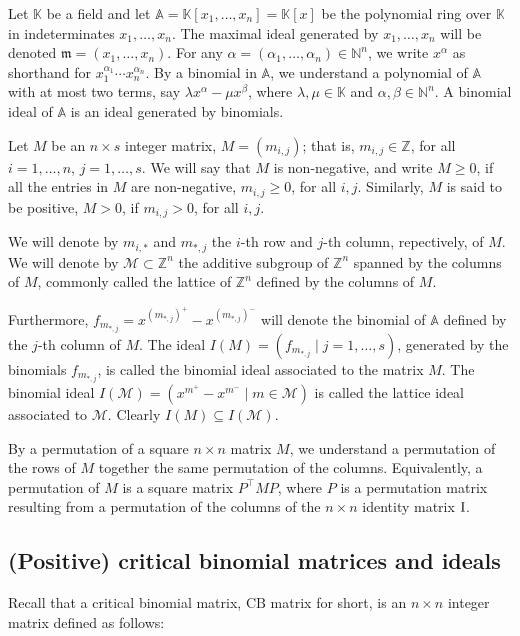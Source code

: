 \documentclass[ALCO]{cedram}
\newcommand{\mbn}{\mbox{$\mathbb{N}$}}
\newcommand{\mbz}{\mbox{$\mathbb{Z}$}}
\newcommand{\mbk}{\mbox{$\mathbb{K}$}}
\newcommand{\mba}{\mbox{$\mathbb{A}$}}
\newcommand{\mcm}{\mbox{$\mathcal{M}$}}
\newcommand{\cb}{\mbox{$\mathrm{CB}$}}
\newcommand{\mfm}{\mbox{$\mathfrak{m}$}}
\newcommand{\I}{\mbox{${\rm I}$}}
\begin{document}
Let $\mbk$ be a field and let $\mba=\mbk[x_1,\ldots ,x_n]=\mbk[x]$ be the
polynomial ring over $\mbk$ in indeterminates $x_1,\ldots ,x_n$. The
maximal ideal generated by $x_1,\ldots ,x_n$ will be denoted
$\mfm=(x_1,\ldots ,x_n)$.  For any $\alpha=(\alpha_1,\ldots
,\alpha_n)\in\mbn^n$, we write $x^\alpha$ as shorthand for
$x_1^{\alpha_1}\cdots x_n^{\alpha_n}$. By a binomial in $\mba$, we
understand a polynomial of $\mba$ with at most two terms, say $\lambda
x^\alpha-\mu x^\beta$, where $\lambda, \mu\in\mbk$ and
$\alpha,\beta\in\mbn^{n}$. A binomial ideal of $\mba$ is an ideal
generated by binomials.

Let $M$ be an $n\times s$ integer matrix, $M=(m_{i,j})$; that is,
$m_{i,j}\in\mbz$, for all $i=1,\ldots ,n$, $j=1,\ldots ,s$. We will
say that $M$ is non-negative, and write $M\geq 0$, if all the entries
in $M$ are non-negative, \ie $m_{i,j}\geq 0$, for all
$i,j$. Similarly, $M$ is said to be positive, $M>0$, if $m_{i,j}>0$,
for all $i,j$.

We will denote by $m_{i,*}$ and $m_{*,j}$ the $i$-th row and $j$-th
column, repectively, of $M$. We will denote by $\mcm\subset \mbz^n$
the additive subgroup of $\mbz^n$ spanned by the columns of $M$,
commonly called the lattice of $\mbz^{n}$ defined by the columns of
$M$.

Furthermore, $f_{m_{*,j}}=x^{(m_{*,j})^+}-x^{(m_{*,j})^-}$ will denote
the binomial of $\mba$ defined by the $j$-th column of $M$. The ideal
$I(M)=(f_{m_{*,j}}\mid j=1,\ldots ,s)$, generated by the binomials
$f_{m_{*,j}}$, is called the binomial ideal associated to the matrix
$M$. The binomial ideal $I(\mcm)=(x^{m^+}-x^{m^-}\mid m\in\mcm)$ is
called the lattice ideal associated to $\mcm$. Clearly $I(M)\subseteq
I(\mcm)$.

By a permutation of a square $n\times n$ matrix $M$, we understand a
permutation of the rows of $M$ together the same permutation of the
columns. Equivalently, a permutation of $M$ is a square matrix
$P^{\top}MP$, where $P$ is a permutation matrix resulting from a
permutation of the columns of the $n\times n$ identity matrix $\I$.

\subsection{(Positive) critical binomial matrices and ideals}
\label{pcbcb}%

 Recall that a critical binomial matrix, $\cb$ matrix for
short, is an $n\times n$ integer matrix defined as follows:
\end{document}
